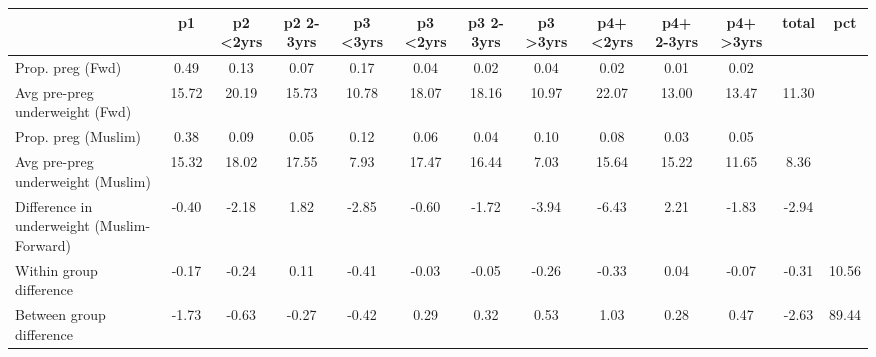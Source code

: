 \begin{tabular}{l*{12}{c}}
\toprule
            &\multicolumn{1}{c}{p1}&\multicolumn{1}{c}{p2 \textless2yrs}&\multicolumn{1}{c}{p2 2-3yrs}&\multicolumn{1}{c}{p3 \textless3yrs}&\multicolumn{1}{c}{p3 <2yrs}&\multicolumn{1}{c}{p3 2-3yrs}&\multicolumn{1}{c}{p3 >3yrs}&\multicolumn{1}{c}{p4+ <2yrs}&\multicolumn{1}{c}{p4+ 2-3yrs}&\multicolumn{1}{c}{p4+ >3yrs}&\multicolumn{1}{c}{total}&\multicolumn{1}{c}{pct}\\
\midrule
\midrule
Prop. preg (Fwd)&        0.49&        0.13&        0.07&        0.17&        0.04&        0.02&        0.04&        0.02&        0.01&        0.02&            &            \\
Avg pre-preg underweight (Fwd)&       15.72&       20.19&       15.73&       10.78&       18.07&       18.16&       10.97&       22.07&       13.00&       13.47&       11.30&            \\
Prop. preg (Muslim)&        0.38&        0.09&        0.05&        0.12&        0.06&        0.04&        0.10&        0.08&        0.03&        0.05&            &            \\
Avg pre-preg underweight (Muslim)&       15.32&       18.02&       17.55&        7.93&       17.47&       16.44&        7.03&       15.64&       15.22&       11.65&        8.36&            \\
Difference in underweight (Muslim-Forward)&       -0.40&       -2.18&        1.82&       -2.85&       -0.60&       -1.72&       -3.94&       -6.43&        2.21&       -1.83&       -2.94&            \\
Within group difference&       -0.17&       -0.24&        0.11&       -0.41&       -0.03&       -0.05&       -0.26&       -0.33&        0.04&       -0.07&       -0.31&       10.56\\
Between group difference&       -1.73&       -0.63&       -0.27&       -0.42&        0.29&        0.32&        0.53&        1.03&        0.28&        0.47&       -2.63&       89.44\\
\bottomrule
\end{tabular}
